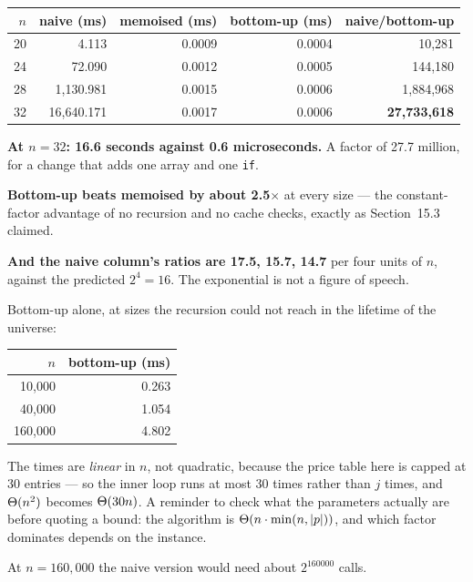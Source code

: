 \begin{worked}[In Seconds]
\begin{center}
\begin{tabular}{@{}rrrrr@{}}
\toprule
\rowcolor{primary!15}
$n$ & naive (ms) & memoised (ms) & bottom-up (ms) & naive/bottom-up \\
\midrule
20 &      4.113 & 0.0009 & 0.0004 &     10{,}281 \\
24 &     72.090 & 0.0012 & 0.0005 &    144{,}180 \\
28 &  1{,}130.981 & 0.0015 & 0.0006 &  1{,}884{,}968 \\
32 & 16{,}640.171 & 0.0017 & 0.0006 & \textbf{27{,}733{,}618} \\
\bottomrule
\end{tabular}
\end{center}

\smallskip
\textbf{At $n = 32$: 16.6 seconds against 0.6 microseconds.} A factor of 27.7
million, for a change that adds one array and one \texttt{if}.

\smallskip
\textbf{Bottom-up beats memoised by about 2.5$\times$} at every size --- the
constant-factor advantage of no recursion and no cache checks, exactly as
Section~15.3 claimed.

\smallskip
\textbf{And the naive column's ratios are 17.5, 15.7, 14.7} per four units of
$n$, against the predicted $2^{4} = 16$. The exponential is not a figure of
speech.
\end{worked}

\begin{worked}
Bottom-up alone, at sizes the recursion could not reach in the lifetime of the
universe:

\begin{center}
\begin{tabular}{@{}rr@{}}
\toprule
\rowcolor{primary!15}
$n$ & bottom-up (ms) \\
\midrule
 10{,}000 & 0.263 \\
 40{,}000 & 1.054 \\
160{,}000 & 4.802 \\
\bottomrule
\end{tabular}
\end{center}

\smallskip
The times are \emph{linear} in $n$, not quadratic, because the price table here
is capped at 30 entries --- so the inner loop runs at most 30 times rather than
$j$ times, and $\Theta(n^{2})$ becomes $\Theta(30n)$. A reminder to check what
the parameters actually are before quoting a bound: the algorithm is
$\Theta(n \cdot \min(n, |p|))$, and which factor dominates depends on the
instance.

\smallskip
At $n = 160{,}000$ the naive version would need about $2^{160000}$ calls.
\end{worked}


